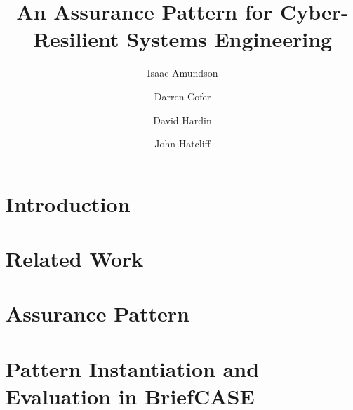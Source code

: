 \documentclass[runningheads]{llncs}
\begin{document}
\title{An Assurance Pattern for Cyber-Resilient Systems Engineering}

\author{
	Isaac Amundson 
	\and Darren Cofer 
	\and David Hardin 
	\and John Hatcliff}



\maketitle

\begin{abstract}

\end{abstract}

\section{Introduction}
\label{sec:introduction}


\section{Related Work}
\label{sec:related-work}


\section{Assurance Pattern}
\label{sec:assurance-pattern}


\section{Pattern Instantiation and Evaluation in BriefCASE}
\label{sec:evaluation}

\end{document}

